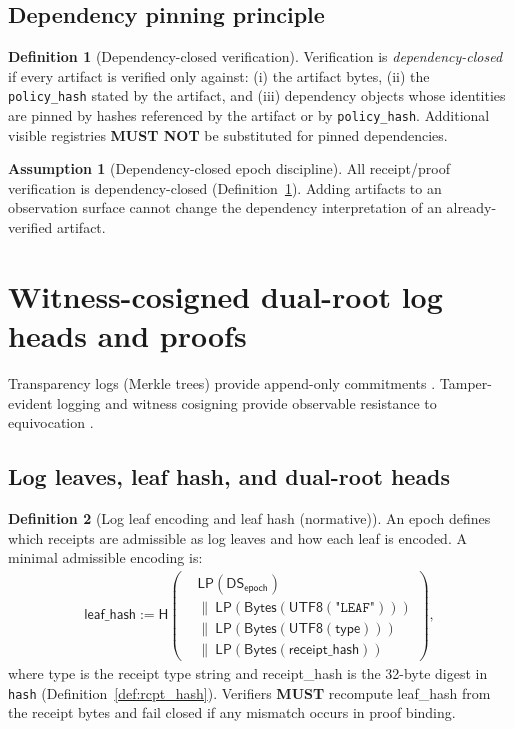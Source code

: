 \documentclass[11pt]{article}
\newcommand{\MUST}{\textbf{MUST}}
\newcommand{\MUSTNOT}{\textbf{MUST NOT}}
\newcommand{\code}[1]{\texttt{#1}}
\newcommand{\term}[1]{\emph{#1}}
\newcommand{\1}{\mathbf{1}}
\newcommand{\Hash}{\mathsf{H}}
\newcommand{\DS}{\mathsf{DS}}
\newcommand{\LP}{\mathsf{LP}}
\theoremstyle{definition}
\newtheorem{definition}{Definition}
\newtheorem{assumption}{Assumption}
\theoremstyle{plain}
\begin{document}
\subsection{Dependency pinning principle}
\label{sec:dep_closed}

\begin{definition}[Dependency-closed verification]
\label{def:dep_closed}
Verification is \term{dependency-closed} if every artifact is verified only against:
(i) the artifact bytes, (ii) the \code{policy\_hash} stated by the artifact, and (iii) dependency objects whose identities are pinned by hashes referenced by the artifact or by \code{policy\_hash}. Additional visible registries \MUSTNOT{} be substituted for pinned dependencies.
\end{definition}

\begin{assumption}[Dependency-closed epoch discipline]
\label{ass:dep_closed}
All receipt/proof verification is dependency-closed (Definition~\ref{def:dep_closed}). Adding artifacts to an observation surface cannot change the dependency interpretation of an already-verified artifact.
\end{assumption}

\section{Witness-cosigned dual-root log heads and proofs}
\label{sec:prefix}

Transparency logs (Merkle trees) provide append-only commitments \cite{Merkle1987,RFC6962,RFC9162}. Tamper-evident logging and witness cosigning provide observable resistance to equivocation \cite{CrosbyWallach2009,SytaCoSi2016}.

\subsection{Log leaves, leaf hash, and dual-root heads}

\begin{definition}[Log leaf encoding and leaf hash (normative)]
\label{def:leaf_hash}
An epoch defines which receipts are admissible as log leaves and how each leaf is encoded. A minimal admissible encoding is:
\begin{align*}
\textsf{leaf\_hash}:=\Hash\!\left(\begin{aligned}
&\LP(\DS_{\textsf{epoch}})\\
&\|\ \LP(\mathsf{Bytes}(\textsf{UTF8}(\texttt{"LEAF"})))\\
&\|\ \LP(\mathsf{Bytes}(\textsf{UTF8}(\textsf{type})))\\
&\|\ \LP(\mathsf{Bytes}(\textsf{receipt\_hash}))
\end{aligned}\right),
\end{align*}
where \textsf{type} is the receipt type string and \textsf{receipt\_hash} is the 32-byte digest in \code{hash} (Definition~\ref{def:rcpt_hash}).
Verifiers \MUST{} recompute \textsf{leaf\_hash} from the receipt bytes and fail closed if any mismatch occurs in proof binding.
\end{definition}
\end{document}
